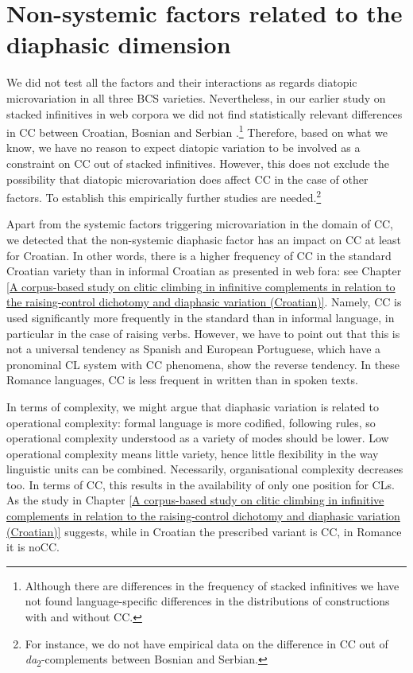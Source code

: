 \section{Non-systemic factors related to the diaphasic dimension}
\label{Non-systemic factors related to the diaphasic dimension}
We did not test all the factors and their interactions as regards diatopic microvariation in all three BCS varieties. Nevertheless, in our earlier study on stacked infinitives in web corpora we did not find statistically relevant differences in CC between Croatian, Bosnian and Serbian \citep*[cf.][]{HKJ18}.\footnote{Although there are differences in the frequency of stacked infinitives we have not found language-specific differences in the distributions of constructions with and without CC.} Therefore, based on what we know, we have no reason to expect diatopic variation to be involved as a constraint on CC out of stacked infinitives. However, this does not exclude the possibility that diatopic microvariation does affect CC in the case of other factors. To establish this empirically further studies are needed.\footnote{For instance, we do not have empirical data on the difference in CC out of \textit{da}\textsubscript{2}-complements between Bosnian and Serbian.}

Apart from the systemic factors triggering microvariation in the domain of CC, we detected that the non-systemic diaphasic factor has an impact on CC at least for Croatian. In other words, there is a higher frequency of CC in the standard Croatian variety than in informal Croatian as presented in web fora: see Chapter \ref{A corpus-based study on clitic climbing in infinitive complements in relation to the raising-control dichotomy and diaphasic variation (Croatian)}. Namely, CC is used significantly more frequently in the standard than in informal language, in particular in the case of raising verbs. However, we have to point out that this is not a universal tendency as Spanish and European Portuguese, which have a pronominal CL system with CC phenomena, show the reverse tendency. In these Romance languages, CC is less frequent in written than in spoken texts. 

In terms of complexity, we might argue that diaphasic variation is related to operational complexity: formal language is more codified, following rules, so operational complexity understood as a variety of modes should be lower. Low operational complexity means little variety, hence little flexibility in the way linguistic units can be combined. Necessarily, organisational complexity decreases too. In terms of CC, this results in the availability of only one position for CLs. As the study in Chapter \ref{A corpus-based study on clitic climbing in infinitive complements in relation to the raising-control dichotomy and diaphasic variation (Croatian)} suggests, while in Croatian the prescribed variant is CC, in Romance it is noCC. 


